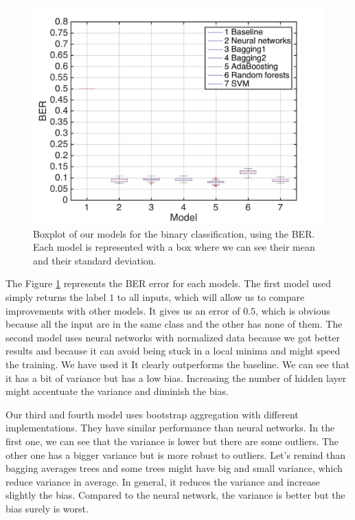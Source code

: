 \documentclass{article} %
\begin{document}
\begin{figure}
\center
\includegraphics[width=5in]{figures/binaryclassifications.jpg} 
\caption{Boxplot of our models for the binary classification, using the BER. Each model is represented with a box where we can see their mean and their standard deviation.}
\label{fig:bin_models}
\end{figure}

The Figure \ref{fig:bin_models} represents the BER error for each models. The first model used simply returns the label $1$ to all inputs, which will allow us to compare improvements with other models. It gives us an error of $0.5$, which is obvious because all the input are in the same class and the other has none of them. The second model uses neural networks with normalized data because we got better results and because it can avoid being stuck in a local minima and might speed the training. We have used it It clearly outperforms the baseline. We can see that it has a bit of variance but has a low bias. Increasing the number of hidden layer might accentuate the variance and diminish the bias.

Our third and fourth model uses bootstrap aggregation with different implementations. They have similar performance than neural networks. In the first one, we can see that the variance is lower but there are some outliers. The other one has a bigger variance but is more robust to outliers. Let's remind than bagging averages trees and some trees might have big and small variance, which reduce variance in average. In general, it reduces the variance and increase slightly the bias. Compared to the neural network, the variance is better but the bias surely is worst.
\end{document}
